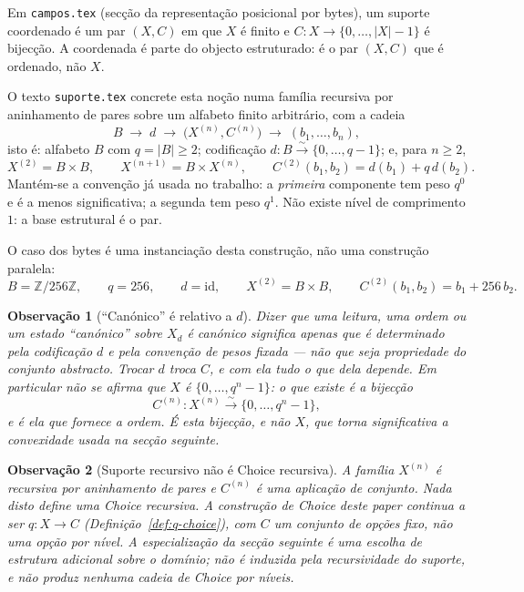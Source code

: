 \documentclass[11pt,a4paper]{article}
\newtheorem{observacao}{Observação}
\begin{document}
Em \texttt{campos.tex} (secção da representação posicional por bytes), um
suporte coordenado é um par \((X,C)\) em que \(X\) é finito e
\(C\colon X\to\{0,\dots,\lvert X\rvert-1\}\) é bijecção. A coordenada é parte do
objecto estruturado: é o par \((X,C)\) que é ordenado, não \(X\).

O texto \texttt{suporte.tex} concrete esta noção numa família recursiva por
aninhamento de pares sobre um alfabeto finito arbitrário, com a cadeia
\[
B
\;\longrightarrow\;
d
\;\longrightarrow\;
\bigl(X^{(n)},C^{(n)}\bigr)
\;\longrightarrow\;
(b_1,\dots,b_n),
\]
isto é: alfabeto \(B\) com \(q=\lvert B\rvert\ge2\); codificação
\(d\colon B\overset{\sim}{\longrightarrow}\{0,\dots,q-1\}\); e, para \(n\ge2\),
\[
X^{(2)}=B\times B,\qquad
X^{(n+1)}=B\times X^{(n)},\qquad
C^{(2)}(b_1,b_2)=d(b_1)+q\,d(b_2).
\]
Mantém-se a convenção já usada no trabalho: a \emph{primeira} componente tem
peso \(q^{0}\) e é a menos significativa; a segunda tem peso \(q^{1}\). Não
existe nível de comprimento \(1\): a base estrutural é o par.

O caso dos bytes é uma instanciação desta construção, não uma construção
paralela:
\[
B=\mathbb Z/256\mathbb Z,\qquad q=256,\qquad d=\mathrm{id},\qquad
X^{(2)}=B\times B,\qquad C^{(2)}(b_1,b_2)=b_1+256\,b_2.
\]

\begin{observacao}[``Canónico'' é relativo a \(d\)]
\label{obs:canonico-relativo}
Dizer que uma leitura, uma ordem ou um estado ``canónico'' sobre \(X_d\) é
canónico significa apenas que é determinado pela codificação \(d\) e pela
convenção de pesos fixada --- não que seja propriedade do conjunto abstracto.
Trocar \(d\) troca \(C\), e com ela tudo o que dela depende. Em particular
\emph{não} se afirma que \(X\) \emph{é} \(\{0,\dots,q^{n}-1\}\): o que existe é
a bijecção
\[
C^{(n)}\colon X^{(n)}\overset{\sim}{\longrightarrow}\{0,\dots,q^{n}-1\},
\]
e é ela que fornece a ordem. É esta bijecção, e não \(X\), que torna
significativa a convexidade usada na secção seguinte.
\end{observacao}

\begin{observacao}[Suporte recursivo não é Choice recursiva]
\label{obs:recursivo-nao-choice}
A família \(X^{(n)}\) é recursiva por aninhamento de pares e \(C^{(n)}\) é uma
aplicação de conjunto. Nada disto define uma Choice recursiva. A construção de
Choice deste paper continua a ser
\(q\colon X\to C\) (Definição~\ref{def:q-choice}), com \(C\) um conjunto de
opções \emph{fixo}, não uma opção por nível. A especialização da
secção seguinte é uma escolha de estrutura \emph{adicional} sobre o domínio;
não é induzida pela recursividade do suporte, e não produz nenhuma cadeia de
Choice por níveis.
\end{observacao}
\end{document}
